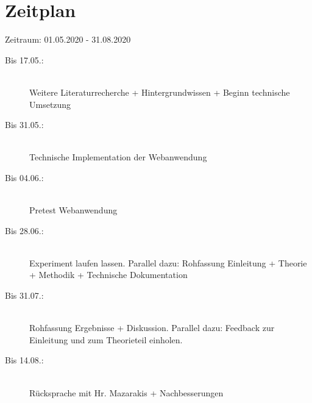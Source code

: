 \documentclass[
    a4paper,
    doc,
    12pt,
    natbib,
]{apa6}
\begin{document}
\section{Zeitplan}

Zeitraum: 01.05.2020 - 31.08.2020

\begin{description}
\item[Bis 17.05.:]\hfill \\ Weitere Literaturrecherche + Hintergrundwissen + Beginn technische Umsetzung
\item[Bis 31.05.:]\hfill \\ Technische Implementation der Webanwendung
\item[Bis 04.06.:]\hfill \\ Pretest Webanwendung
\item[Bis 28.06.:]\hfill \\ Experiment laufen lassen. Parallel dazu: Rohfassung Einleitung + Theorie + Methodik + Technische Dokumentation
\item[Bis 31.07.:]\hfill \\ Rohfassung Ergebnisse + Diskussion. Parallel dazu: Feedback zur Einleitung und zum Theorieteil einholen. 
\item[Bis 14.08.:]\hfill \\  Rücksprache mit Hr. Mazarakis + Nachbesserungen

\end{description}


\end{document}
